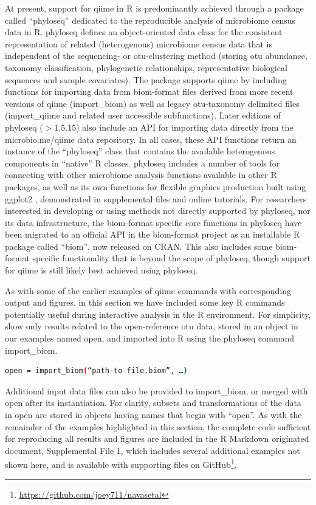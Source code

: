At present, support for \gls{qiime} in R is predominantly achieved through a package called “phyloseq” \cite{McMurdie2013}
dedicated to the reproducible analysis of microbiome census data in R. phyloseq defines an object-oriented data class
for the consistent representation of related (heterogenous) microbiome census data that is independent of the sequencing-
or \gls{otu}-clustering method (storing \gls{otu} abundance, taxonomy classification, phylogenetic relationships, representative
biological sequences and sample covariates). The package supports \gls{qiime} by including functions for importing data
from biom-format files derived from more recent versions of \gls{qiime} (import\_biom) as well as legacy \gls{otu}-taxonomy delimited
files (import\_qiime and related user accessible subfunctions). Later editions of phyloseq ($>$1.5.15) also include an
API for importing data directly from the microbio.me/qiime data repository. In all cases, these API functions
return an instance of the “phyloseq” class that contains the available heterogenous components in “native” R classes.
phyloseq includes a number of tools for connecting with other microbiome analysis functions available in other R packages,
as well as its own functions for flexible graphics production built using ggplot2 \cite{Wickham2009}, demonstrated
in supplemental files and online tutorials. For researchers interested in developing or using methods not directly
supported by phyloseq, nor its data infrastructure, the biom-format specific core functions in phyloseq have been
migrated to an official API in the biom-format project as an installable R package called “biom”, now released on
CRAN. This also includes some biom-format specific functionality that is beyond the scope of phyloseq, though support
for \gls{qiime} is still likely best achieved using phyloseq.

As with some of the earlier examples of \gls{qiime} commands with corresponding output and figures, in this section we
have included some key R commands potentially useful during interactive analysis in the R environment. For simplicity,
show only results related to the open-reference \gls{otu} data, stored in an object in our examples named open,
and imported into R using the phyloseq command import\_biom.

\begin{lstlisting}[language=bash]
open = import_biom(“path-to-file.biom”, …)
\end{lstlisting}

Additional input data files can also be provided to import\_biom, or merged with open after its instantiation.
For clarity, subsets and transformations of the data in open are stored in objects having names that begin
with “open”. As with the remainder of the examples highlighted in this section, the complete code
sufficient for reproducing all results and figures are included in the R Markdown originated document,
Supplemental File 1, which includes several additional examples not shown here, and is available with supporting
files on GitHub\footnote{\url{https://github.com/joey711/navasetal}}.

